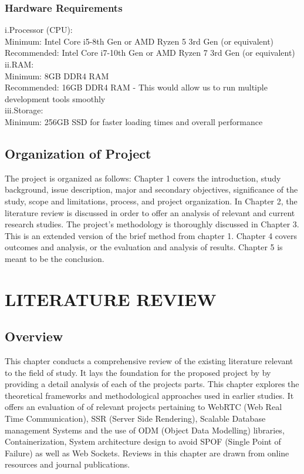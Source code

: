 \documentclass[a4paper,12pt]{article}  %
\begin{document}
\subsubsection{Hardware Requirements}
i.Processor (CPU):\\ Minimum: Intel Core i5-8th Gen or AMD Ryzen 5 3rd Gen (or
equivalent)\\ Recommended: Intel Core i7-10th Gen or AMD Ryzen 7 3rd Gen (or
equivalent)\\ ii.RAM: \\ Minimum: 8GB DDR4 RAM\\ Recommended: 16GB DDR4 RAM -
This would allow us to run multiple development tools smoothly\\ iii.Storage:\\
Minimum: 256GB SSD for faster loading times and overall performance\\

\subsection{Organization of Project}

The project is organized as follows: Chapter 1 covers the introduction, study
background, issue description, major and secondary objectives, significance of
the study, scope and limitations, process, and project organization. In Chapter
2, the literature review is discussed in order to offer an analysis of relevant
and current research studies. The project's methodology is thoroughly discussed
in Chapter 3. This is an extended version of the brief method from chapter 1.
Chapter 4 covers outcomes and analysis, or the evaluation and analysis of
results. Chapter 5 is meant to be the conclusion.\\ \newpage

\section{LITERATURE REVIEW}
\subsection{Overview}
This chapter conducts a comprehensive review of the existing literature
relevant to the field of study. It lays the foundation for the proposed project
by by providing a detail analysis of each of the projects parts. This chapter
explores the theoretical frameworks and methodological approaches used in
earlier studies. It offers an evaluation of of relevant projects pertaining to
WebRTC (Web Real Time Communication), SSR (Server Side Rendering), Scalable
Database management Systems and the use of ODM (Object Data Modelling)
libraries, Containerization, System architecture design to avoid SPOF (Single
Point of Failure) as well as Web Sockets. Reviews in this chapter are drawn
from online resources and journal publications.\\
\end{document}
